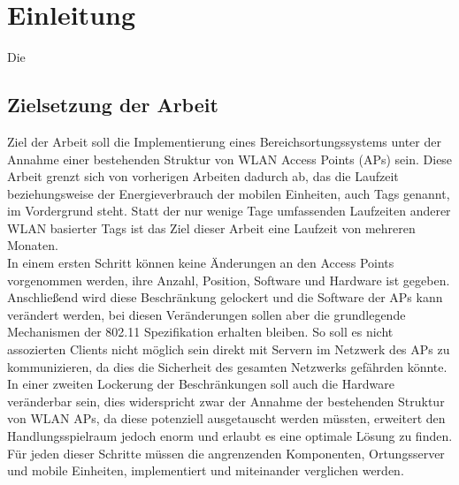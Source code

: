 
\chapter{Einleitung}
\label{ch:Einleitung}
Die 

\section{Zielsetzung der Arbeit}
\label{ch:Einleitung:sec:Zielsetzung}
Ziel der Arbeit soll die Implementierung eines Bereichsortungssystems unter der Annahme einer bestehenden Struktur von WLAN Access Points (APs) sein. 
Diese Arbeit grenzt sich von vorherigen Arbeiten dadurch ab, das die Laufzeit beziehungsweise der Energieverbrauch der mobilen Einheiten, auch Tags genannt, im Vordergrund steht. 
Statt der nur wenige Tage umfassenden Laufzeiten anderer WLAN basierter Tags ist das Ziel dieser Arbeit eine Laufzeit von mehreren Monaten. \\
In einem ersten Schritt können keine Änderungen an den Access Points vorgenommen werden, ihre Anzahl, Position, Software und Hardware ist gegeben. 
Anschließend wird diese Beschränkung gelockert und die Software der APs kann verändert werden, bei diesen Veränderungen sollen aber die grundlegende Mechanismen der 802.11 Spezifikation erhalten bleiben. 
So soll es nicht assozierten Clients nicht möglich sein direkt mit Servern im Netzwerk des APs zu kommunizieren, da dies die Sicherheit des gesamten Netzwerks gefährden könnte.
In einer zweiten Lockerung der Beschränkungen soll auch die Hardware veränderbar sein, dies widerspricht zwar der Annahme der bestehenden Struktur von WLAN APs, da diese potenziell ausgetauscht werden müssten, erweitert den Handlungsspielraum jedoch enorm und erlaubt es eine optimale Lösung zu finden. 
Für jeden dieser Schritte müssen die angrenzenden Komponenten, Ortungsserver und mobile Einheiten, implementiert und miteinander verglichen werden. \\


